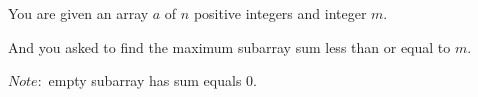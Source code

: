 You are given an array $a$ of $n$ positive integers and integer $m$.

And you asked to find the maximum subarray sum less than or equal to $m$.

$Note: $ empty subarray has sum equals $0$.
